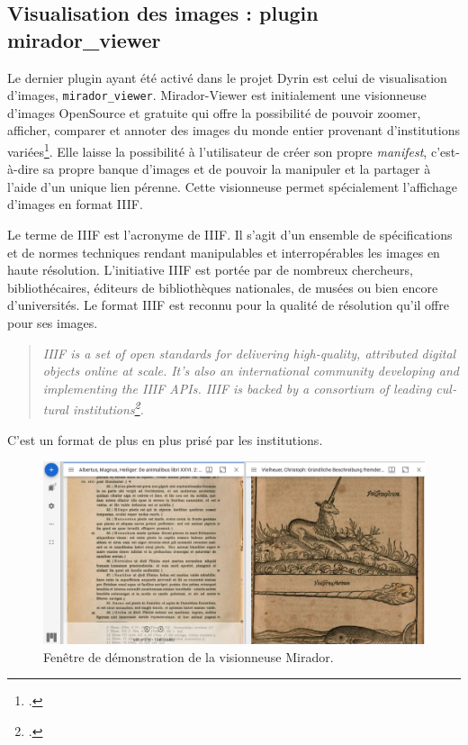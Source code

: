 \documentclass[a4paper,12pt,twoside]{book}
\begin{document}
\subsection{Visualisation des images : plugin mirador\_viewer}
Le dernier plugin ayant été activé dans le projet Dyrin est celui de visualisation d'images, \texttt{mirador\_viewer}. Mirador-Viewer est initialement une visionneuse d'images OpenSource et gratuite qui offre la possibilité de pouvoir zoomer, afficher, comparer et annoter des images du monde entier provenant d'institutions variées\footcite{mirador}. Elle laisse la possibilité à l'utilisateur de créer son propre \textit{manifest}, c'est-à-dire sa propre banque d'images et de pouvoir la manipuler et la partager à l'aide d'un unique lien pérenne. Cette visionneuse permet spécialement l'affichage d'images en format \acrshort{IIIF}.

Le terme de \acrshort{IIIF} est l'acronyme de \acrlong{IIIF}. Il s'agit d'un ensemble de spécifications et de normes techniques rendant manipulables et interropérables les images en haute résolution. L'initiative \acrshort{IIIF} est portée par de nombreux chercheurs, bibliothécaires, éditeurs de bibliothèques nationales, de musées ou bien encore d'universités. Le format \acrshort{IIIF} est reconnu pour la qualité de résolution qu'il offre pour ses images.
\begin{otherlanguage}{english}
\begin{quote}
    \textit{IIIF is a set of open standards for delivering high-quality, attributed digital objects online at scale. It's also an international community developing and implementing the IIIF APIs. IIIF is backed by a consortium of leading cultural institutions\footcite{iiif}.}
\end{quote}
\end{otherlanguage}
C'est un format de plus en plus prisé par les institutions.

\begin{figure}[H]
    \centering
    \includegraphics[width=\linewidth]{img/partie_3/mirador_demo.JPG}
    \caption{Fenêtre de démonstration de la visionneuse Mirador.}
    \label{mirador}
\end{figure}
\end{document}
